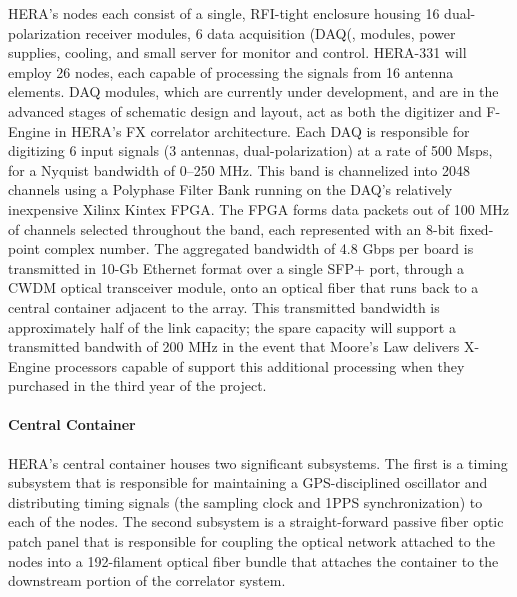 \documentclass[preprint]{aastex}
\begin{document}

HERA's nodes each consist of a single, RFI-tight enclosure housing 16 dual-polarization receiver modules, 
6 data acquisition (DAQ(, %
modules, power supplies, cooling, and small server for monitor and control.  HERA-331 will employ
26 nodes, each capable of processing the signals from 16 antenna elements.
DAQ modules, which are currently under development, and are in the advanced stages of schematic design and layout,
act as both the digitizer and F-Engine in HERA's FX correlator architecture.  Each DAQ
is responsible for digitizing 6 input signals (3 antennas, dual-polarization) at a rate
of 500 Msps, for a Nyquist bandwidth of 0--250 MHz.  This band is channelized into 2048 channels
using a Polyphase Filter Bank running on the DAQ's relatively inexpensive Xilinx Kintex FPGA.
The FPGA forms data packets out of 100 MHz of channels selected throughout the band, each represented
with an 8-bit fixed-point complex number.  The aggregated bandwidth of 4.8 Gbps per board is transmitted in
10-Gb Ethernet format over a single SFP+ port, through a CWDM optical transceiver module, onto an optical
fiber that runs back to a central container adjacent to the array.  
This transmitted bandwidth is approximately
half of the link capacity; the spare capacity will support a transmitted bandwith
of 200 MHz in the event that Moore's Law delivers X-Engine processors capable of support
this additional processing when they purchased in the third year of the project.

\paragraph{Central Container}

HERA's central container houses two significant subsystems.  The first is a timing subsystem
that is responsible for maintaining a GPS-disciplined oscillator and distributing timing
signals (the sampling clock and 1PPS synchronization) to each of the nodes.  The second
subsystem is a straight-forward passive fiber optic patch panel that is responsible for coupling
the optical network attached to the nodes into a 192-filament optical fiber bundle 
that attaches the container to the downstream portion of the correlator system.
\end{document}
